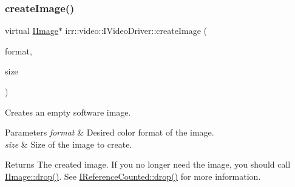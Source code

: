 \subsubsection{\texorpdfstring{create\+Image()}{createImage()}\hspace{0.1cm}{\footnotesize\ttfamily [2/8]}}
{\footnotesize\ttfamily virtual \hyperlink{classirr_1_1video_1_1IImage}{I\+Image}$\ast$ irr\+::video\+::\+I\+Video\+Driver\+::create\+Image (\begin{DoxyParamCaption}\item[{\hyperlink{namespaceirr_1_1video_a1d5e487888c32b1674a8f75116d829ed}{E\+C\+O\+L\+O\+R\+\_\+\+F\+O\+R\+M\+AT}}]{format,  }\item[{const \hyperlink{classirr_1_1core_1_1dimension2d}{core\+::dimension2d}$<$ \hyperlink{namespaceirr_a0416a53257075833e7002efd0a18e804}{u32} $>$ \&}]{size }\end{DoxyParamCaption})\hspace{0.3cm}{\ttfamily [pure virtual]}}



Creates an empty software image. 


\begin{DoxyParams}{Parameters}
{\em format} & Desired color format of the image. \\
\hline
{\em size} & Size of the image to create. \\
\hline
\end{DoxyParams}
\begin{DoxyReturn}{Returns}
The created image. If you no longer need the image, you should call \hyperlink{classirr_1_1IReferenceCounted_a03856a09355b89d178090c4a5f738543}{I\+Image\+::drop()}. See \hyperlink{classirr_1_1IReferenceCounted_a03856a09355b89d178090c4a5f738543}{I\+Reference\+Counted\+::drop()} for more information. 
\end{DoxyReturn}
\mbox{\label{classirr_1_1video_1_1IVideoDriver_af92ef735bc8c755f5c201a52a70d05e8}} 
